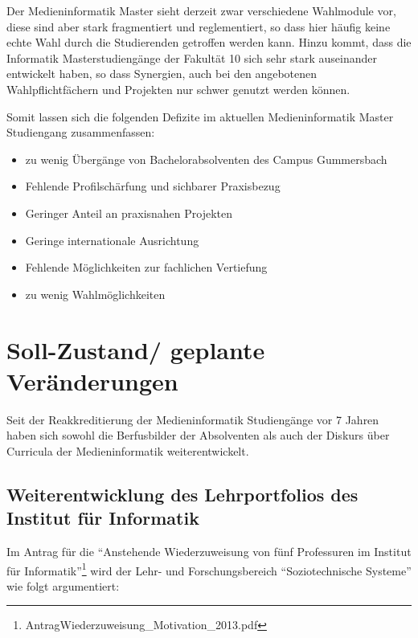 Der Medieninformatik Master sieht derzeit zwar verschiedene Wahlmodule
vor, diese sind aber stark fragmentiert und reglementiert, so dass hier
häufig keine echte Wahl durch die Studierenden getroffen werden kann.
Hinzu kommt, dass die Informatik Masterstudiengänge der Fakultät 10 sich
sehr stark auseinander entwickelt haben, so dass Synergien, auch bei den
angebotenen Wahlpflichtfächern und Projekten nur schwer genutzt werden
können.

Somit lassen sich die folgenden Defizite im aktuellen Medieninformatik
Master Studiengang zusammenfassen:

\begin{itemize}
\tightlist
\item
  zu wenig Übergänge von Bachelorabsolventen des Campus Gummersbach
\item
  Fehlende Profilschärfung und sichbarer Praxisbezug
\item
  Geringer Anteil an praxisnahen Projekten
\item
  Geringe internationale Ausrichtung
\item
  Fehlende Möglichkeiten zur fachlichen Vertiefung
\item
  zu wenig Wahlmöglichkeiten
\end{itemize}

\chapter{Soll-Zustand/ geplante
Veränderungen}\label{soll-zustand-geplante-veruxe4nderungen}

Seit der Reakkreditierung der Medieninformatik Studiengänge vor 7 Jahren
haben sich sowohl die Berfusbilder der Absolventen als auch der Diskurs
über Curricula der Medieninformatik weiterentwickelt.

\section{Weiterentwicklung des Lehrportfolios des Institut für
Informatik}\label{weiterentwicklung-des-lehrportfolios-des-institut-fuxfcr-informatik}

Im Antrag für die ``Anstehende Wiederzuweisung von fünf Professuren im
Institut für Informatik''\footnote{AntragWiederzuweisung\_Motivation\_2013.pdf}
wird der Lehr- und Forschungsbereich ``Soziotechnische Systeme'' wie
folgt argumentiert:


